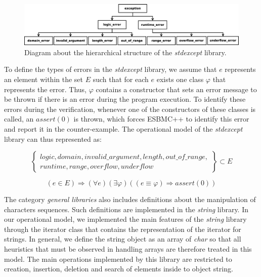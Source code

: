 \documentclass[a4paper]{llncs}
\begin{document}
\begin{figure}[ht]
\centering
\includegraphics[scale=0.23]{figures/stdexcept.eps}
\caption{Diagram about the hierarchical structure of the \textit{stdexcept} library.}
\label{figure:stdexcept}
\end{figure}

To define the types of errors in the \textit{stdexcept} library, we assume that
$e$ represents an element within the set $E$ such that for each $e$ exists one class
$\varphi$ that represents the error. Thus, $\varphi$ contains a constructor that sets an
error message to be thrown if there is an error during the program execution.
To identify these errors during the verification, whenever one of the
constructors of these classes is called, an $assert(0)$ is thrown, which forces ESBMC++ to
identify this error and report it in the counter-example. The operational model of the
\textit{stdexcept} library can thus represented as:

\begin{equation}
\label{kind-of-exceptions}
\left\{ \begin{array}{ll}
              logic, domain, invalid\_argument, length, out\_of\_range,\\ runtime, range, overflow, underflow
        \end{array} \right\} \subset E
\end{equation}


\begin{equation}
\label{stdexcept}
\left( e \in E \right)
\Rightarrow \left(\forall e\right)\left(\exists\varphi\right)\left(\left(e\equiv\varphi\right)
\Rightarrow assert\left(0\right)\right)
\end{equation}

The category \textit{general libraries} also includes definitions
about the manipulation of characters sequences. Such definitions
are implemented in the \textit{string} library. In our operational
model, we implemented the main features of the \textit{string}
library through the iterator class that contains the
representation of the iterator for strings. In general,
we define the string object as an array of \textit{char} so that all
heuristics that must be observed in handling arrays are therefore
treated in this model. The main operations implemented by this library
are restricted to creation, insertion, deletion and search of elements
inside to object string.
\end{document}
